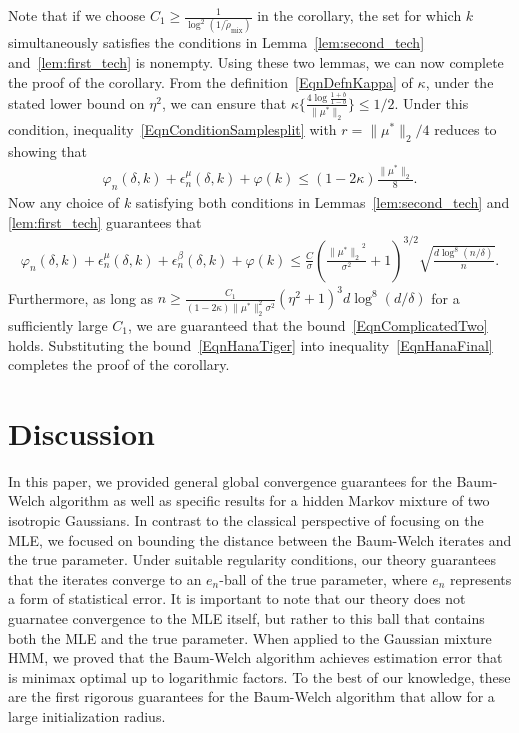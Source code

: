 \documentclass[twoside,11pt]{article}
\newcommand{\numobs}{\ensuremath{n}}
\newcommand{\usedim}{\ensuremath{d}}
\newcommand{\norm}[1]{\ensuremath{\|#1\|_2}}
\newcommand{\subsize}{\numobs} %
\newcommand{\mixcoefeff}{\ensuremath{\widetilde{\rho}_{\mathrm{mix}}}}
\newcommand{\epsilonobs}{\epsilon^\paramobs}
\newcommand{\epsilontrans}{\epsilon^\paramtrans}
\newcommand{\paramobs}{\mu}
\newcommand{\trueparamobs}{\ensuremath{\paramobs^*}}
\newcommand{\paramtrans}{\beta}
\newcommand{\SNR}{\eta^2}
\newcommand{\kdim}{\ensuremath{k}}
\newcommand{\BOUNDFUN}{\ensuremath{\varphi}}
\newcommand{\mustar}{\ensuremath{\mu^*}}
\newcommand{\BIGCON}{\ensuremath{C}}
\newcommand{\minimaxrad}{\ensuremath{e_\numobs}}
\begin{document}
Note that if we choose $\BIGCON_1  \geq \frac{1}{\log^2(1/\mixcoefeff)}$ in the corollary,
the set for which $\kdim$ simultaneously satisfies the conditions
in Lemma~\ref{lem:second_tech} and~\ref{lem:first_tech} is nonempty. 
Using these two lemmas, we can now complete the proof of the
corollary.  From the definition~\eqref{EqnDefnKappa} of $\kappa$,
under the stated lower bound on $\SNR$, we can ensure that $\kappa
\big \{ \frac{4 \log \frac{1+b}{1-b}}{\|\mustar\|_2} \big\} \leq 1/2$.
Under this condition, inequality~\eqref{EqnConditionSamplesplit} with \mbox{$r
  = \|\mustar\|_2/4$} reduces to showing that
\begin{align}
\label{EqnComplicatedTwo}
\BOUNDFUN_{\subsize}(\delta, \kdim) + \epsilonobs_{\subsize}
(\delta, \kdim) + \BOUNDFUN (\kdim) \leq (1 - 2 \kappa)
\frac{\|\trueparamobs\|_2}{8}.
\end{align}
Now any choice of $k$  satisfying both conditions in
Lemmas~\ref{lem:second_tech} and \ref{lem:first_tech} guarantees that
\begin{align}
\label{EqnHanaTiger}
\varphi_{\subsize} (\delta, \kdim) + \epsilonobs_{\subsize} (\delta,
\kdim) + \epsilontrans_{\subsize} (\delta, \kdim) + \BOUNDFUN(\kdim)
\leq \frac{C}{\sigma}(\frac{\norm{\trueparamobs}^2}{\sigma^2}+1)^{3/2}  \sqrt{\frac{ d
    \log^8 (\numobs/\delta)}{\numobs}}.
\end{align}
Furthermore, as long as $\numobs \geq \frac{\BIGCON_1}{(1-2\kappa)\|\trueparamobs\|_2^2\sigma^2} 
(\SNR+1)^3  \usedim \log^8(  \usedim/\delta)$ for a sufficiently large
$\BIGCON_1$, we are guaranteed that the
bound~\eqref{EqnComplicatedTwo} holds. 
Substituting the bound~\eqref{EqnHanaTiger} into
inequality~\eqref{EqnHanaFinal} completes the proof of the corollary.





\section{Discussion}

In this paper, we provided general global convergence guarantees for
the Baum-Welch algorithm as well as specific results for a hidden
Markov mixture of two isotropic Gaussians.  In contrast to the
classical perspective of focusing on the MLE, we focused on bounding
the distance between the Baum-Welch iterates and the true parameter.
Under suitable regularity conditions, our theory guarantees that the
iterates converge to an $\minimaxrad$-ball of the true parameter,
where $\minimaxrad$ represents a form of statistical error.  It
is important to note that our theory does not guarnatee convergence to
the MLE itself, but rather to this ball that contains both the MLE and
the true parameter.  When applied to the Gaussian mixture HMM, we
proved that the Baum-Welch algorithm achieves estimation error that is minimax
optimal up to logarithmic factors.  To the best of our knowledge,
these are the first rigorous guarantees for the Baum-Welch algorithm
that allow for a large initialization radius.
\end{document}
